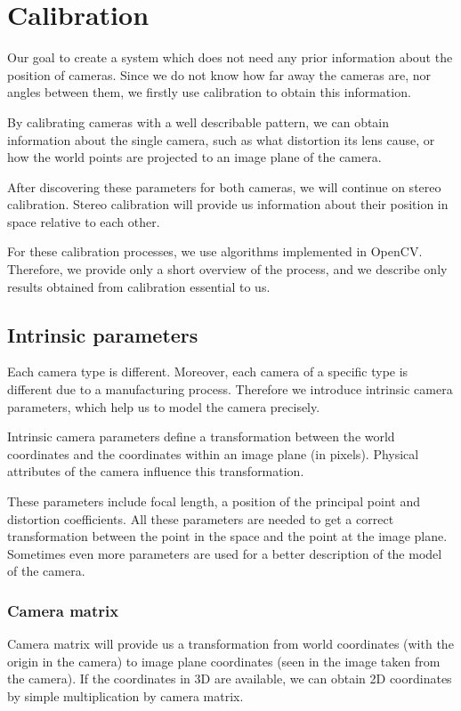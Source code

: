 \chapter{Calibration}

Our goal to create a system which does not need any prior information about the
position of cameras. Since we do not know how far away the cameras are, nor
angles between them, we firstly use calibration to obtain this information.

By calibrating cameras with a well describable pattern, we can obtain
information about the single camera, such as what distortion its lens cause, or
how the world points are projected to an image plane of the camera.

After discovering these parameters for both cameras, we will continue on stereo
calibration. Stereo calibration will provide us information about their
position in space relative to each other.

For these calibration processes, we use algorithms implemented in OpenCV.
Therefore, we provide only a short overview of the process, and we describe
only results obtained from calibration essential to us.

\section{Intrinsic parameters}

Each camera type is different. Moreover, each camera of a specific type is
different due to a manufacturing process. Therefore we introduce intrinsic
camera parameters, which help us to model the camera precisely.

Intrinsic camera parameters define a transformation between the world coordinates and
the coordinates within an image plane (in pixels). Physical attributes of the
camera influence this transformation.

These parameters include focal length, a position of the principal point and
distortion coefficients. All these parameters are needed to get a correct
transformation between the point in the space and the point at the image plane.
Sometimes even more parameters are used for a better description of the model
of the camera.

\subsection{Camera matrix} Camera matrix will provide us a transformation from
world coordinates (with the origin in the camera) to image plane coordinates
(seen in the image taken from the camera). If the coordinates in 3D are
available, we can obtain 2D coordinates by simple multiplication by camera
matrix.

